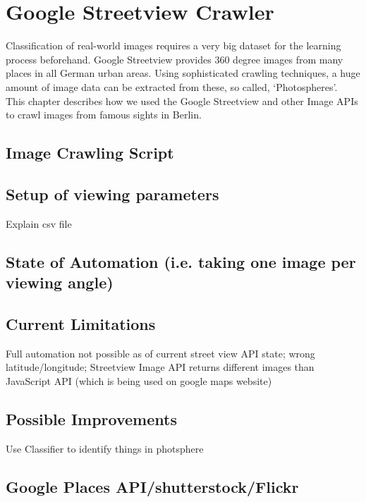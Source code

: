 \section{Google Streetview Crawler}
Classification of real-world images requires a very big dataset for the learning process beforehand. Google Streetview provides 360 degree images from many places in all German urban areas. Using sophisticated crawling techniques, a huge amount of image data can be extracted from these, so called, `Photospheres'.\\
This chapter describes how we used the Google Streetview and other Image APIs to crawl images from famous sights in Berlin.

\subsection{Image Crawling Script}

\subsection{Setup of viewing parameters}
Explain csv file

\subsection{State of Automation (i.e. taking one image per viewing angle)}

\subsection{Current Limitations}
Full automation not possible as of current street view API state; wrong latitude/longitude; Streetview Image API returns different images than JavaScript API (which is being used on google maps website)

\subsection{Possible Improvements}
Use Classifier to identify things in photsphere

\subsection{Google Places API/shutterstock/Flickr}